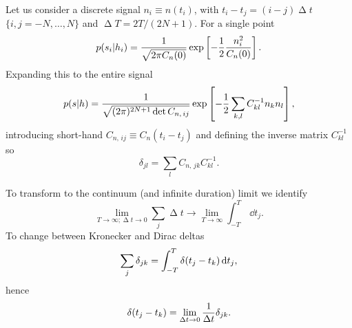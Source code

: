 Let us consider a discrete signal $n_i \equiv n(t_i)$, with $t_i - t_j = (i - j)\upDelta t$ $\{i,j = -N, \ldots, N\}$ and $\upDelta T = 2T/(2N + 1)$. For a single point \citep{Finn1992}
\begin{equation}
p(s_i|h_i) = \frac{1}{\sqrt{2\pi C_n(0)}} \exp\left[-\frac{1}{2} \frac{n_i^2}{C_n(0)}\right].
\end{equation}
Expanding this to the entire signal
\begin{equation}
p(s|h) = \frac{1}{\sqrt{(2\pi)^{2N+1} \det C_{n,\,ij}}} \exp\left[-\frac{1}{2} \sum_{k,l}C^{-1}_{kl}n_k n_l\right],
\label{eq:prod_prob}
\end{equation}
introducing short-hand $C_{n,\,ij} \equiv C_n(t_i - t_j)$ and defining the inverse matrix $C^{-1}_{kl}$ so
\begin{equation}
\delta_{jl} = \sum_l C_{n,\,jk}C^{-1}_{kl}.
\end{equation}

To transform to the continuum (and infinite duration) limit we identify
\begin{equation}
\lim_{T \rightarrow \infty; \upDelta t \rightarrow 0} \sum_j \upDelta t \rightarrow \lim_{T \rightarrow \infty} \int_{-T}^{T}\,\dd t_j.
\end{equation}
To change between Kronecker and Dirac deltas
\begin{equation}
\sum_j \delta_{jk} = \int_{-T}^{T}{\delta(t_j - t_k)}\,\mathrm{d}{t_j},
\end{equation}
hence
\begin{equation}
\delta(t_j - t_k) = \lim_{\upDelta t \rightarrow 0} \recip{\upDelta t} \delta_{jk}.
\end{equation}

